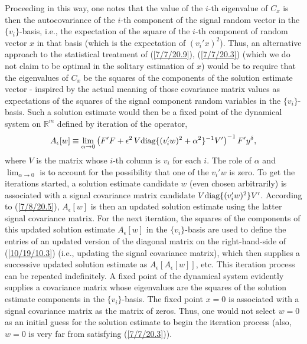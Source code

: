 \documentclass{amsart}
\numberwithin{equation}{section}
\theoremstyle{definition}
\numberwithin{theorem}{section}
\begin{document}
Proceeding in this way, one notes that the value of the $i$-th eigenvalue of $C_x$ is then the autocovariance of the $i$-th component of the signal random vector in the $\{v_i\}$-basis, i.e., the expectation of the square of the $i$-th component of random vector  $x$ in that basis (which is the expectation of $(v_i'x)^2$).   Thus, an alternative approach to the statistical treatment of (\ref{7/7/20.9}), (\ref{7/7/20.3}) (which we do not claim to be optimal in the solitary estimation of $x$)  would be to require that the eigenvalues of $C_x$ be the squares of the components of the solution estimate vector -  inspired by the actual meaning of those covariance matrix values as expectations  of the squares of the signal component random variables in the $\{v_i\}$-basis.  Such a solution estimate would then be  a fixed point of the dynamical system on $\mathbb{R}^m$ defined by iteration of the operator, \begin{equation}\label{10/19/10.3} A_\epsilon[w] \equiv \lim_{\alpha\rightarrow 0}\left(F'F+\epsilon^2\, V\mbox{\rm diag}\{(v_i'w)^2 + \alpha^2\}^{-1}V' \right)^{-1} F'y^\delta, \end{equation} where $V$ is the matrix whose $i$-th column is $v_i$ for each $i$. The role of $\alpha$ and $\lim_{\alpha\rightarrow 0}$ is to account for the possibility that one of the $v_i'w$ is zero.  To get the iterations started,  a solution estimate candidate $w$ (even chosen arbitrarily) is associated with a signal covariance matrix candidate $V \mbox{\rm diag}\{(v _i'w)^2\}V'$.    According to (\ref{7/8/20.5}),  $A_\epsilon[w]$ is then an updated solution estimate using the latter signal covariance matrix.  For the next iteration, the squares of the components of this updated solution estimate  $A_\epsilon[w]$ in the $\{v_i\}$-basis are used to define the entries of an updated version of the diagonal matrix on the right-hand-side of (\ref{10/19/10.3}) (i.e., updating the signal covariance matrix), which then supplies a successive updated solution estimate as $A_\epsilon[A_\epsilon[w]]$, etc. This iteration process can be repeated indefinitely.  A fixed point of the dynamical system evidently supplies a covariance matrix whose eigenvalues are the squares of the solution estimate components in the $\{v_i\}$-basis.  
 The fixed point $x=0$ is associated with a signal covariance matrix as the matrix of zeros. Thus, one would not select $w=0$ as an initial guess for the solution estimate to begin the iteration process (also, $w=0$ is very far from satisfying (\ref{7/7/20.3})).  
 
\end{document}
